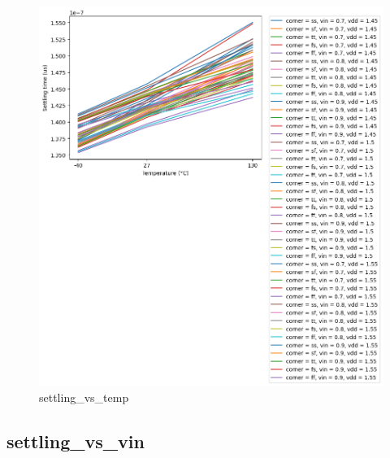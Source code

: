 \documentclass[
  a4paper,
  DIV=11,
  numbers=noendperiod]{scrartcl}
\begin{document}
\begin{tcolorbox}
\begin{figure}[H]
{\centering \includegraphics{./cace/_docs/ota-5t/schematic/settling_vs_temp.png}

}

\caption{settling\_vs\_temp}

\end{figure}%

\subsection*{settling\_vs\_vin}\label{settling_vs_vin}

\begin{figure}[H]


\end{figure}
\end{tcolorbox}
\end{document}
